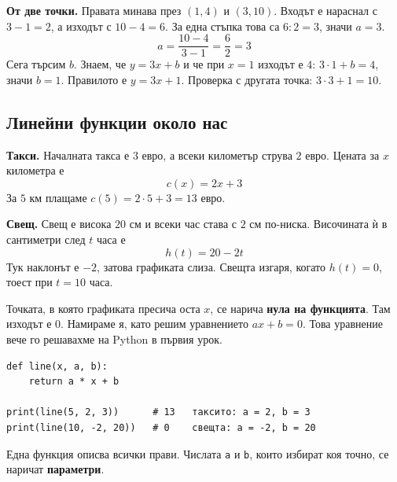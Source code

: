 \documentclass[11pt,a4paper]{article}
\begin{document}
\textbf{От две точки.} Правата минава през $(1,4)$ и $(3,10)$.
Входът е нараснал с $3-1=2$, а изходът с $10-4=6$. За една стъпка това са $6:2=3$, значи $a=3$.
\[ a = \frac{10-4}{3-1} = \frac{6}{2} = 3 \]
Сега търсим $b$. Знаем, че $y=3x+b$ и че при $x=1$ изходът е $4$: \; $3\cdot 1+b=4$, значи $b=1$.
Правилото е $y=3x+1$. Проверка с другата точка: $3\cdot 3+1=10$.

\subsection{Линейни функции около нас}

\begin{minipage}[t]{0.5\textwidth}
\textbf{Такси.} Началната такса е $3$ евро, а всеки километър струва $2$ евро. Цената за $x$ километра е
\[ c(x)=2x+3 \]
За $5$ км плащаме $c(5)=2\cdot 5+3=13$ евро.

\vspace{4pt}
\textbf{Свещ.} Свещ е висока $20$ см и всеки час става с $2$ см по-ниска. Височината ѝ в сантиметри след $t$ часа е
\[ h(t)=20-2t \]
Тук наклонът е $-2$, затова графиката слиза. Свещта изгаря, когато $h(t)=0$, тоест при $t=10$ часа.
\end{minipage}\hfill
\begin{minipage}[t]{0.46\textwidth}
\vspace{0pt}
\end{minipage}

Точката, в която графиката пресича оста $x$, се нарича \textbf{нула на функцията}. Там изходът е $0$.
Намираме я, като решим уравнението $ax+b=0$. Това уравнение вече го решавахме на Python в първия урок.

\begin{pybox}
\begin{Verbatim}
def line(x, a, b):
    return a * x + b

print(line(5, 2, 3))      # 13   таксито: a = 2, b = 3
print(line(10, -2, 20))   # 0    свещта: a = -2, b = 20
\end{Verbatim}
Една функция описва всички прави. Числата \texttt{a} и \texttt{b}, които избират коя точно, се наричат \textbf{параметри}.
\end{pybox}
\end{document}
